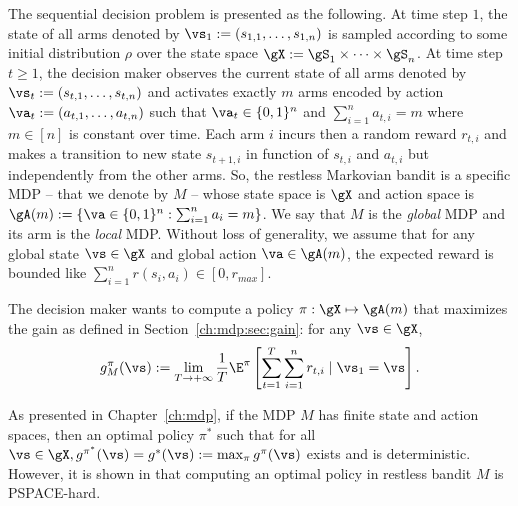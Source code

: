 The sequential decision problem is presented as the following.
At time step $1$, the state of all arms denoted by $\vs_1:=(s_{1,1},\dots,s_{1,n})$ is sampled according to some initial distribution $\rho$ over the state space $\gX:=\gS_1\times\dots\times\gS_n$.
At time step $t\ge1$, the decision maker observes the current state of all arms denoted by $\vs_t:=(s_{t,1},\dots,s_{t,n})$ and activates exactly $m$ arms encoded by action $\va_t:=(a_{t,1},\dots,a_{t,n})$ such that $\va_t\in\{0,1\}^n$ and $\sum_{i=1}^{n} a_{t,i}=m$ where $m\in[n]$ is constant over time.
Each arm $i$ incurs then a random reward $r_{t,i}$ and makes
a transition to new state $s_{t+1,i}$ in function of $s_{t,i}$ and $a_{t,i}$ but independently from the other arms.
So, the restless Markovian bandit is a specific MDP -- that we denote by $M$ -- whose state space is $\gX$ and action space is $\gA(m):=\{\va\in\{0,1\}^n : \sum_{i=1}^{n}a_i =m\}$.
We say that $M$ is the \emph{global} MDP and its arm is the \emph{local} MDP.
Without loss of generality, we assume that for any global state $\vs\in\gX$ and global action $\va\in\gA(m)$, the expected reward is bounded like $\sum_{i=1}^{n}r(s_i,a_i)\in[0,r_{max}]$.

The decision maker wants to compute a policy $\pi:\gX\mapsto\gA(m)$ that maximizes the gain as defined in Section~\ref{ch:mdp:sec:gain}: for any $\vs\in\gX$,
\begin{equation}
    \label{ch:restless:eq:obj}
    g^\pi_M(\vs):=\lim_{T\to+\infty}\frac1T \E^\pi\left[ \sum_{t=1}^{T} \sum_{i=1}^nr_{t,i} \mid \vs_1=\vs\right].
\end{equation}

As presented in Chapter~\ref{ch:mdp}, if the MDP $M$ has finite state and action spaces, then an optimal policy $\pi^*$ such that for all $\vs\in\gX, g^{\pi^*}(\vs)=g^*(\vs):=\max_{\pi}g^{\pi}(\vs)$ exists and is deterministic.
However, it is shown in \cite[Theorem~4]{papadimitriou1994complexity} that computing an optimal policy in restless bandit $M$ is PSPACE-hard.


